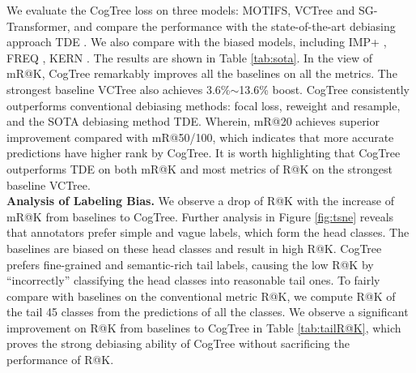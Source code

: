 \documentclass{article}
\begin{document}
We evaluate the CogTree loss 
on three models: MOTIFS, VCTree and SG-Transformer, and compare the performance with the state-of-the-art debiasing approach TDE \cite{Tang2020Unbiased}. We also compare with the biased models, including IMP+ \cite{xu2017scene}, FREQ \cite{zellers2018neural}, KERN \cite{chen2019knowledge}. The results are shown in Table \ref{tab:sota}. In the view of mR@K, CogTree remarkably improves all the baselines on all the metrics. The strongest baseline VCTree also achieves 3.6\%$\sim$13.6\% boost. CogTree consistently outperforms conventional debiasing methods: focal loss, reweight and resample, and the SOTA debiasing method TDE. Wherein, mR@20 achieves superior improvement compared with mR@50/100, which indicates that more accurate predictions have higher rank by CogTree. It is worth highlighting that CogTree outperforms TDE on both mR@K and most metrics of R@K on the strongest baseline VCTree.  \\
\textbf{Analysis of Labeling Bias. } We observe a drop of R@K  with the increase of mR@K from baselines to CogTree. Further analysis in Figure \ref{fig:tsne} reveals that annotators prefer simple and vague labels, which form the head classes. The baselines are biased on these head classes and result in high R@K.
CogTree prefers fine-grained and semantic-rich tail labels, causing the low R@K by ``incorrectly'' classifying the head classes into reasonable tail ones. To fairly compare with baselines on the conventional metric R@K, we compute R@K of the tail 45 classes from the predictions of all the classes. We observe a significant improvement on R@K from baselines to CogTree in Table \ref{tab:tailR@K}, which proves the strong debiasing ability of CogTree without sacrificing the performance of R@K.



\iffalse
\begin{figure}[t]
    \centering
    \texttt{[image: Figure5.pdf]}
    \caption{R@100 of the most frequent 35 classes on PredCls.}
    \label{fig:recall}
\end{figure}
\fi
\end{document}

